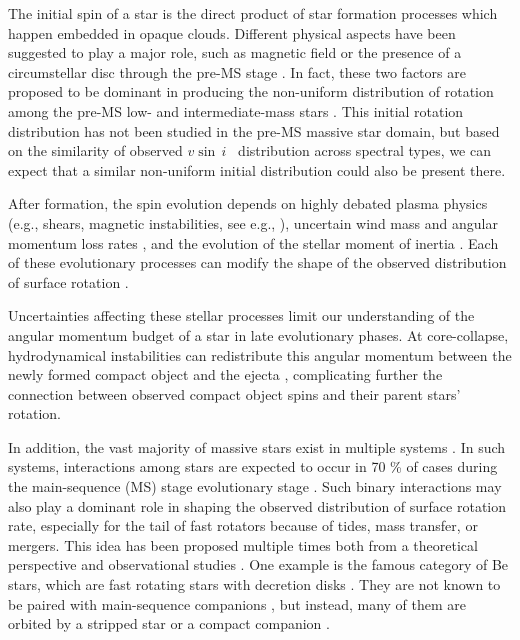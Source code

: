 \documentclass{aa}
\newcommand{\vsini} {$v\sin\,i$}
\begin{document}
The initial spin of a star is the direct product of star formation
processes which happen embedded in opaque clouds. Different physical
aspects have been suggested to play a major role, such as magnetic
field or the presence of a circumstellar disc through the pre-MS stage
\citep[e.g.,][]{Rosen_2012}. In fact, these two factors are
proposed to be dominant in producing the non-uniform distribution
of rotation among the pre-MS low- and intermediate-mass stars
\citep{Bastian_2020}. This initial rotation distribution has not been
studied in the pre-MS massive star domain, but based on the similarity of observed \vsini~ distribution across spectral types, we can expect that a similar
 non-uniform initial distribution could also be present there.

After formation, the spin evolution depends on highly debated plasma physics (e.g., shears, magnetic
instabilities, see e.g., \citealt{Tayler_1973, spruit:99, spruit:02,Maeder_2000, fuller:19, denhartogh:20,ji:23}), uncertain wind mass
and angular momentum loss rates \citep[e.g.,][]{smith:14, renzo:17},
and the evolution of the stellar moment of inertia \citep[e.g.,][]{langer:98,zhao:20}.
Each of these evolutionary processes can modify the shape of the observed distribution of surface rotation \citep{Maeder_2000}.

Uncertainties affecting these stellar processes limit our
understanding of the angular momentum budget of a star in late evolutionary phases.
At core-collapse, hydrodynamical instabilities can redistribute this angular momentum between the newly formed compact object and the ejecta \citep[e.g.,][]{Kazeroni_2017}, complicating further the
connection between observed compact object spins and their parent stars' rotation.



In addition, the vast majority of massive stars exist in multiple systems \citep[e.g.,][]{Mason_2009, Duchene_2013, Sana_2013, Kobulnicky_2014, Dunstall_2015, Almeida_2017, Offner_2022}.
In such systems, interactions among stars are expected to occur in 70 \% of cases during the main-sequence (MS) stage evolutionary stage \citep{Sana_2012}.
Such binary interactions may also play a dominant role in shaping the observed
distribution of surface rotation rate, especially for the tail of fast rotators because of tides, mass transfer, or mergers. This idea has been proposed
  multiple times both from a theoretical perspective
  \citep{packet:81, Pols_1994, deMink_2013, vinciguerra:20} and observational studies \citep{blaauw:93,  vfts_2015_otype, Cazorla2017b, Britavskiy_2023}.
One example is the famous category of Be stars, which are fast rotating stars with decretion disks \citep{Fremat_2005, Rivinius_2013}.
They are not known to be paired with main-sequence companions \citep{Bodensteiner_2020}, but instead, many of them are orbited by a stripped star \citep{Wang_2018,Wang_2021} or a compact companion \citep[e.g.,][]{Reig_2011,Dodd_2023}.
\end{document}
